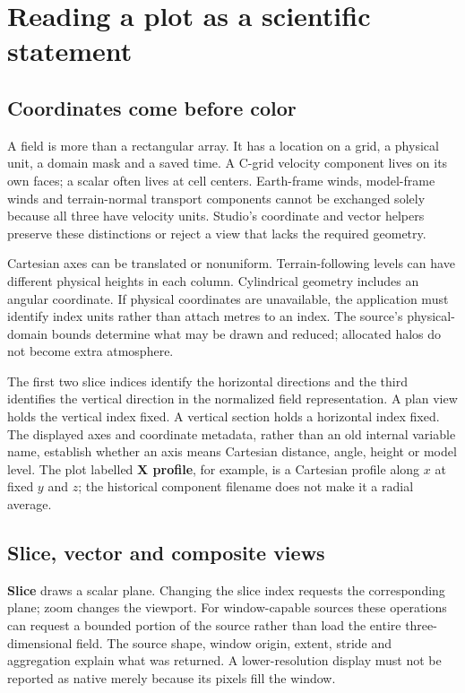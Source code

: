 \section{Reading a plot as a scientific statement}
\subsection{Coordinates come before color}
A field is more than a rectangular array. It has a location on a grid, a physical
unit, a domain mask and a saved time. A C-grid velocity component lives on its
own faces; a scalar often lives at cell centers. Earth-frame winds, model-frame
winds and terrain-normal transport components cannot be exchanged solely because
all three have velocity units. Studio's coordinate and vector helpers preserve
these distinctions or reject a view that lacks the required geometry.

Cartesian axes can be translated or nonuniform. Terrain-following levels can
have different physical heights in each column. Cylindrical geometry includes
an angular coordinate. If physical coordinates are unavailable, the application
must identify index units rather than attach metres to an index. The source's
physical-domain bounds determine what may be drawn and reduced; allocated halos
do not become extra atmosphere.

The first two slice indices identify the horizontal directions and the third
identifies the vertical direction in the normalized field representation. A
plan view holds the vertical index fixed. A vertical section holds a horizontal
index fixed. The displayed axes and coordinate metadata, rather than an old
internal variable name, establish whether an axis means Cartesian distance,
angle, height or model level. The plot labelled \textbf{X profile}, for example,
is a Cartesian profile along $x$ at fixed $y$ and $z$; the historical component
filename does not make it a radial average.

\subsection{Slice, vector and composite views}
\textbf{Slice} draws a scalar plane. Changing the slice index requests the
corresponding plane; zoom changes the viewport. For window-capable sources these
operations can request a bounded portion of the source rather than load the
entire three-dimensional field. The source shape, window origin, extent, stride
and aggregation explain what was returned. A lower-resolution display must not
be reported as native merely because its pixels fill the window.

